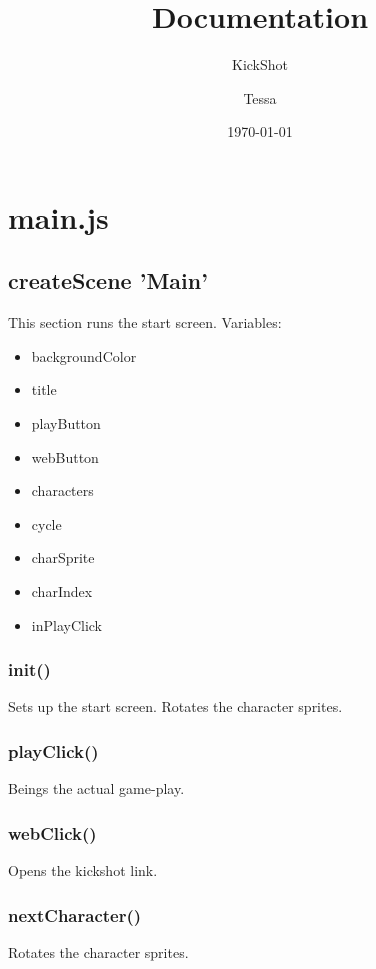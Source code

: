 \documentclass[12pt]{article}
\title{Documentation}
\subtitle{KickShot}
\date{\today}
\author{
Tessa
}
\begin{document}
\maketitle

\section*{main.js}
\subsection*{createScene 'Main'}
This section runs the start screen. 
Variables: 
\begin{itemize}
\item backgroundColor
\item title 
\item playButton
\item webButton
\item characters
\item cycle
\item charSprite 
\item charIndex 
\item inPlayClick 
\end{itemize}
\subsubsection*{init()}
Sets up the start screen. Rotates the character sprites. 
\subsubsection*{playClick()}
Beings the actual game-play.
\subsubsection*{webClick()}
Opens the kickshot link. 
\subsubsection*{nextCharacter()}
Rotates the character sprites.
\end{document}
